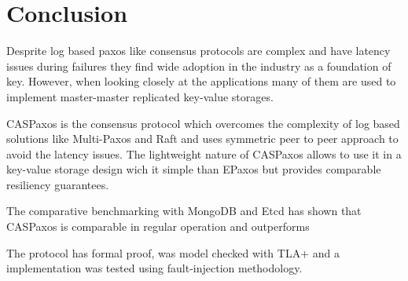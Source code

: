\documentclass[12pt]{article}
\theoremstyle{definition}
\begin{document}
\section{Conclusion}

Desprite log based paxos like consensus protocols are complex and have latency issues during failures they find wide adoption in the industry as a foundation of key. However, when looking closely at the applications many of them are used to implement master-master replicated key-value storages.

CASPaxos is the consensus protocol which overcomes the complexity of log based solutions like Multi-Paxos and Raft and uses symmetric peer to peer approach to avoid the latency issues. The lightweight nature of CASPaxos allows to use it in a key-value storage design wich it simple than EPaxos but provides comparable resiliency guarantees.

The comparative benchmarking with MongoDB and Etcd has shown that CASPaxos is comparable in regular operation and outperforms

The protocol has formal proof, was model checked with TLA+ and a implementation was tested using fault-injection methodology.
\end{document}
